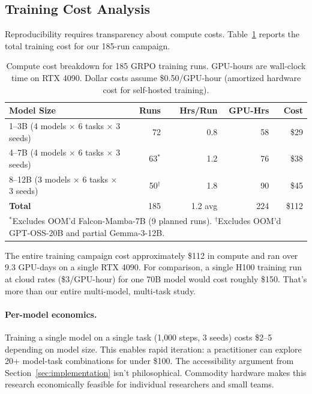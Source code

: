 \documentclass[11pt]{article}
\begin{document}
\subsection{Training Cost Analysis}
\label{sec:training-cost}

Reproducibility requires transparency about compute costs.  Table~\ref{tab:compute-cost} reports the total training cost for our 185-run campaign.

\begin{table}[h]
\centering
\small
\caption{Compute cost breakdown for 185 GRPO training runs.  GPU-hours are wall-clock time on RTX 4090. Dollar costs assume \$0.50/GPU-hour (amortized hardware cost for self-hosted training).}
\label{tab:compute-cost}
\begin{tabular}{l rrrr}
\toprule
\textbf{Model Size} & \textbf{Runs} & \textbf{Hrs/Run} & \textbf{GPU-Hrs} & \textbf{Cost} \\
\midrule
1--3B (4 models $\times$ 6 tasks $\times$ 3 seeds) & 72 & 0.8 & 58 & \$29 \\
4--7B (4 models $\times$ 6 tasks $\times$ 3 seeds) & 63$^*$ & 1.2 & 76 & \$38 \\
8--12B (3 models $\times$ 6 tasks $\times$ 3 seeds) & 50$^\dagger$ & 1.8 & 90 & \$45 \\
\midrule
\textbf{Total} & 185 & 1.2 avg & 224 & \$112 \\
\bottomrule
\multicolumn{5}{l}{\footnotesize $^*$Excludes OOM'd Falcon-Mamba-7B (9 planned runs).  $^\dagger$Excludes OOM'd GPT-OSS-20B and partial Gemma-3-12B.}
\end{tabular}
\end{table}

The entire training campaign cost approximately \$112 in compute and ran over 9.3 GPU-days on a single RTX 4090.  For comparison, a single H100 training run at cloud rates (\$3/GPU-hour) for one 70B model would cost roughly \$150.  That's more than our entire multi-model, multi-task study.

\paragraph{Per-model economics.} Training a single model on a single task (1{,}000 steps, 3 seeds) costs \$2--5 depending on model size.  This enables rapid iteration: a practitioner can explore 20+ model-task combinations for under \$100. The accessibility argument from Section~\ref{sec:implementation} isn't philosophical.  Commodity hardware makes this research economically feasible for individual researchers and small teams.
\end{document}
